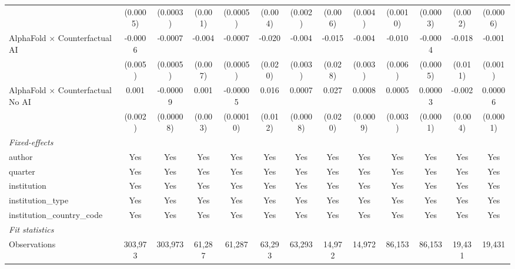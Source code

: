 \begin{tabular}{lcccccccccccc}
                                            & (0.0005)      & (0.0003)       & (0.001) & (0.0005)     & (0.004) & (0.002)      & (0.006) & (0.004)      & (0.0010) & (0.0003) & (0.002)     & (0.0006)\\   
   AlphaFold $\times$ Counterfactual AI     & -0.0006       & -0.0007        & -0.004  & -0.0007      & -0.020  & -0.004       & -0.015  & -0.004       & -0.010   & -0.0004  & -0.018      & -0.001\\   
                                            & (0.005)       & (0.0005)       & (0.007) & (0.0005)     & (0.020) & (0.003)      & (0.028) & (0.003)      & (0.006)  & (0.0005) & (0.011)     & (0.001)\\   
   AlphaFold $\times$ Counterfactual No AI  & 0.001         & -0.00009       & 0.001   & -0.00005     & 0.016   & 0.0007       & 0.027   & 0.0008       & 0.0005   & 0.00003  & -0.002      & 0.00006\\   
                                            & (0.002)       & (0.00008)      & (0.003) & (0.00010)    & (0.012) & (0.0008)     & (0.020) & (0.0009)     & (0.003)  & (0.0001) & (0.004)     & (0.0001)\\   
   \midrule
   \emph{Fixed-effects}\\
   author                                   & Yes           & Yes            & Yes     & Yes          & Yes     & Yes          & Yes     & Yes          & Yes      & Yes      & Yes         & Yes\\  
   quarter                                  & Yes           & Yes            & Yes     & Yes          & Yes     & Yes          & Yes     & Yes          & Yes      & Yes      & Yes         & Yes\\  
   institution                              & Yes           & Yes            & Yes     & Yes          & Yes     & Yes          & Yes     & Yes          & Yes      & Yes      & Yes         & Yes\\  
   institution\_type                        & Yes           & Yes            & Yes     & Yes          & Yes     & Yes          & Yes     & Yes          & Yes      & Yes      & Yes         & Yes\\  
   institution\_country\_code               & Yes           & Yes            & Yes     & Yes          & Yes     & Yes          & Yes     & Yes          & Yes      & Yes      & Yes         & Yes\\  
   \midrule
   \emph{Fit statistics}\\
   Observations                             & 303,973       & 303,973        & 61,287  & 61,287       & 63,293  & 63,293       & 14,972  & 14,972       & 86,153   & 86,153   & 19,431      & 19,431\\  

\end{tabular}
